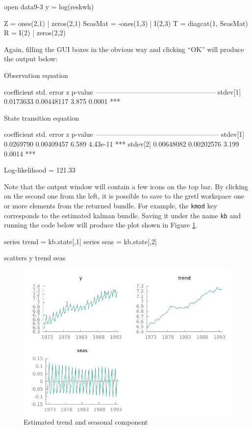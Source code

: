 \begin{code}
open data9-3
y = log(reskwh)

Z = ones(2,1) | zeros(2,1)
SeasMat = -ones(1,3) | I(2,3)
T = diagcat(1, SeasMat)
R = I(2) | zeros(2,2)
\end{code}

Again, filling the GUI boxes in the obvious way and clicking ``OK''
will produce the output below:

\begin{code}

Observation equation

             coefficient   std. error     z     p-value
  -----------------------------------------------------
  stdev[1]    0.0173633    0.00448117   3.875   0.0001  ***


State transition equation

             coefficient   std. error     z     p-value 
  ------------------------------------------------------
  stdev[1]   0.0269790     0.00409457   6.589   4.43e-11 ***
  stdev[2]   0.00648082    0.00202576   3.199   0.0014   ***

  Log-likelihood = 121.33
\end{code}

Note that the output window will contain a few icons on the top
bar. By clicking on the second one from the left, it is possible to
save to the gretl workspace one or more elements from the returned
bundle. For example, the \texttt{kmod} key corresponds to the
estimated kalman bundle. Saving it under the name \texttt{kb} and
running the code below will produce the plot shown in Figure
\ref{fig:rw+seas}.

\begin{code}
series trend = kb.state[,1]
series seas  = kb.state[,2]

scatters y trend seas
\end{code}


\begin{figure}[htb]
  \centering
  \includegraphics[scale=1.0]{figures/rw+seas}
  \caption{Estimated trend and seasonal component}\label{fig:rw+seas}
\end{figure}

\let\steta\relax
\let\strR\relax


